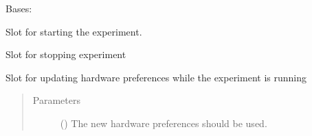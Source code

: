 \documentclass[letterpaper,10pt,english]{sphinxmanual}
\begin{document}
\begin{fulllineitems}
\label{\detokenize{NoSeMazeControl/Controllers:Controllers.ExperimentControl.ExperimentController}}
\pysigstartsignatures
{}
\pysigstopsignatures
\sphinxAtStartPar
Bases: 

\begin{fulllineitems}
\label{\detokenize{NoSeMazeControl/Controllers:Controllers.ExperimentControl.ExperimentController.start}}
\pysigstartsignatures
{}
\pysigstopsignatures
\sphinxAtStartPar
Slot for starting the experiment.

\end{fulllineitems}


\begin{fulllineitems}
\label{\detokenize{NoSeMazeControl/Controllers:Controllers.ExperimentControl.ExperimentController.stop}}
\pysigstartsignatures
{}
\pysigstopsignatures
\sphinxAtStartPar
Slot for stopping experiment

\end{fulllineitems}


\begin{fulllineitems}
\label{\detokenize{NoSeMazeControl/Controllers:Controllers.ExperimentControl.ExperimentController.update_pref}}
\pysigstartsignatures
{}
\pysigstopsignatures
\sphinxAtStartPar
Slot for updating hardware preferences while the experiment is
running
\begin{quote}\begin{description}
\item[{Parameters}] \leavevmode
\sphinxAtStartPar
{} () \textendash{} The new hardware preferences should be used.


\end{description}
\end{quote}
\end{fulllineitems}
\end{fulllineitems}
\end{document}
